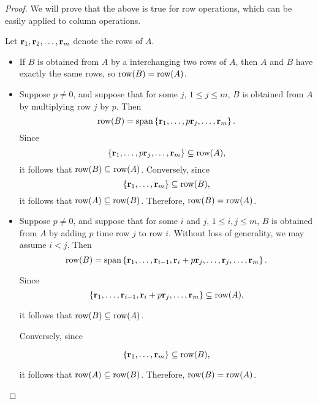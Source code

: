 \begin{proof}
  We will prove that the above is true for row operations, which can
  be easily applied to column operations.

  Let $\mbox{\bf r}_1, \mbox{\bf r}_2, \ldots, \mbox{\bf r}_m$ denote the rows of
  $A$.

  \begin{itemize}
  \item If $B$ is obtained from $A$ by a interchanging two rows of
    $A$, then $A$ and $B$ have exactly the same rows, so
    $\mbox{\rm row}(B)=\mbox{\rm row}(A)$.

  \item Suppose $p\neq 0$, and suppose that for some $j$,
    $1\leq j\leq m$, $B$ is obtained from $A$ by multiplying row $j$
    by $p$.  Then
    \begin{equation*}
      \func{row}(B)=\sspan\set{\vect{r}_1, \ldots, p\vect{r}_{j}, \ldots, \vect{r}_m}.
    \end{equation*}
    Since
    \begin{equation*}
      \left\{\mbox{\bf r}_1, \ldots,
        p\mbox{\bf r}_{j}, \ldots, \mbox{\bf r}_m\right\} \subseteq\mbox{\rm row}(A),
    \end{equation*}
    it follows that $\mbox{\rm row}(B)\subseteq\mbox{\rm row}(A)$.
    Conversely, since
    \begin{equation*}
      \left\{\mbox{\bf r}_1, \ldots,
        \mbox{\bf r}_m\right\}\subseteq\mbox{\rm row}(B),
    \end{equation*}
    it follows that $\mbox{\rm row}(A)\subseteq\mbox{\rm row}(B)$.
    Therefore, $\mbox{\rm row}(B)=\mbox{\rm row}(A)$.
  \item Suppose $p\neq 0$, and suppose that for some $i$ and $j$,
    $1\leq i,j\leq m$, $B$ is obtained from $A$ by adding $p$ time row
    $j$ to row $i$.  Without loss of generality, we may assume $i<j$.
    Then
    \begin{equation*}
      \func{row}(B)=\sspan\set{\vect{r}_1, \ldots, \vect{r}_{i-1},
        \vect{r}_i+p\vect{r}_j, \ldots,\vect{r}_j,\ldots, \vect{r}_m}.
    \end{equation*}

    Since
    \begin{equation*}
      \left\{\mbox{\bf r}_1, \ldots, \mbox{\bf r}_{i-1},
        \mbox{\bf r}_i+p\mbox{\bf r}_{j}, \ldots, \mbox{\bf r}_m\right\}
      \subseteq\mbox{\rm row}(A),
    \end{equation*}

    it follows that $\mbox{\rm row}(B)\subseteq\mbox{\rm row}(A)$.

    Conversely, since

    \begin{equation*}
      \left\{\mbox{\bf r}_1, \ldots, \mbox{\bf r}_m\right\}\subseteq\mbox{\rm row}(B),
    \end{equation*}

    it follows that $\mbox{\rm row}(A)\subseteq\mbox{\rm row}(B)$.
    Therefore, $\mbox{\rm row}(B)=\mbox{\rm row}(A)$.
  \end{itemize}
\end{proof}

